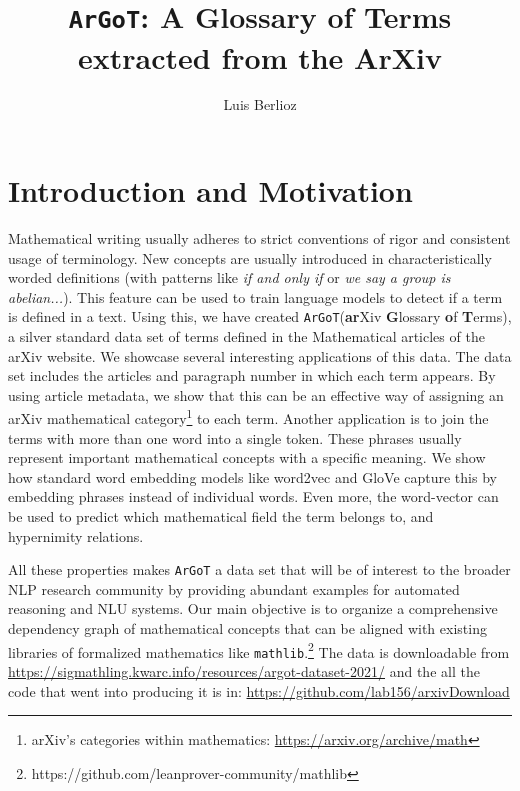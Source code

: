 \documentclass[submission,copyright,creativecommons]{eptcs}
\title{\texttt{ArGoT}: A Glossary of Terms extracted from the ArXiv}
\author{Luis Berlioz
    \institute{University of Pittsburgh\\
    Pennsylvania, USA}
\email{lab232@pitt.edu}
}
\newcommand{\argot}{\texttt{ArGoT}\xspace}
\begin{document}
\maketitle

\begin{abstract}
    
\end{abstract}

\section{Introduction and Motivation}
Mathematical writing usually adheres to strict conventions of rigor
and consistent usage of terminology.
New concepts are usually introduced in characteristically worded 
definitions (with patterns like \textit{if
    and only if} or \textit{we say a group is abelian...}). 
This feature can be used to train language models to detect if a term is defined in a text.
Using this, we have created \argot (\textbf{ar}Xiv \textbf{G}lossary \textbf{o}f \textbf{T}erms), a silver standard data set of terms defined in
the Mathematical articles of the arXiv website. 
We showcase several interesting applications of this data. The data set includes the articles and  paragraph number in which each term appears. By using article metadata, we show that this can be an effective way of assigning an arXiv mathematical category\footnote{arXiv's categories within mathematics: \url{https://arxiv.org/archive/math}} to each term.
Another application is to join the terms with more than one word into a single token.
These phrases usually represent important mathematical concepts with a specific meaning.
We show how standard word embedding models like word2vec
\cite{word2vec} and GloVe \cite{DBLP:conf/emnlp/PenningtonSM14} capture this by embedding phrases instead of individual words.
Even more, the word-vector can be used to predict which mathematical field the term belongs to, and hypernimity relations.

All these properties  makes \argot  a data set that will be of
interest to the broader NLP research community by providing abundant
examples for automated reasoning and NLU systems. 
Our main objective is to organize a comprehensive dependency graph of mathematical concepts that can be aligned with existing libraries of formalized mathematics like \texttt{mathlib}.\footnote{https://github.com/leanprover-community/mathlib}
The data is downloadable from \url{https://sigmathling.kwarc.info/resources/argot-dataset-2021/} and the all the code that went
into producing it is in: \url{https://github.com/lab156/arxivDownload}
\end{document}

